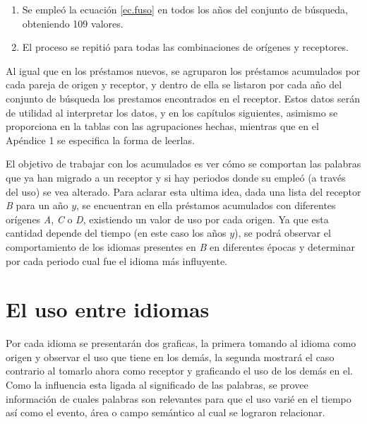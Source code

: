 \begin{enumerate}
	
	
	\item Se empleó la ecuación \ref{ec.fuso} en todos los años del conjunto de búsqueda, obteniendo 109 valores.
	
	\item El proceso se repitió para todas las combinaciones de orígenes y receptores.

\end{enumerate}

Al igual que en los préstamos nuevos,  se agruparon los préstamos acumulados por cada pareja de origen y receptor,  y dentro de ella se listaron por cada año del conjunto de búsqueda los prestamos encontrados en el receptor. Estos datos serán de utilidad al interpretar los datos, y en los capítulos siguientes,  asimismo se proporciona en \cite{prestamos_acumulados} la tablas con las agrupaciones hechas, mientras que en el Apéndice 1 se especifica la forma de leerlas. 

El objetivo  de trabajar con los acumulados es ver cómo se comportan las palabras que ya han migrado a un receptor y si hay periodos donde su empleó (a través del uso) se vea alterado. Para aclarar esta ultima idea, dada una lista del receptor \textit{B} para un año $y$, se encuentran en ella préstamos acumulados con diferentes orígenes \textit{A}, \textit{C} o \textit{D},  existiendo un valor de uso por cada origen. Ya que esta cantidad depende del tiempo (en este caso los  años $y$),  se podrá observar el comportamiento de los idiomas presentes en  \textit{B} en diferentes épocas y determinar por cada periodo cual fue el idioma más influyente. 





\section {El uso entre idiomas} 

Por cada idioma se presentarán dos graficas, la primera tomando al idioma como origen y observar el uso que tiene en los demás, la segunda mostrará el caso contrario al tomarlo ahora como receptor y graficando el uso de los demás en el.  Como la influencia esta ligada al significado de las palabras, se provee información de cuales palabras son relevantes para que el uso varié en el tiempo así como el evento, área o campo semántico al cual se lograron relacionar. 


